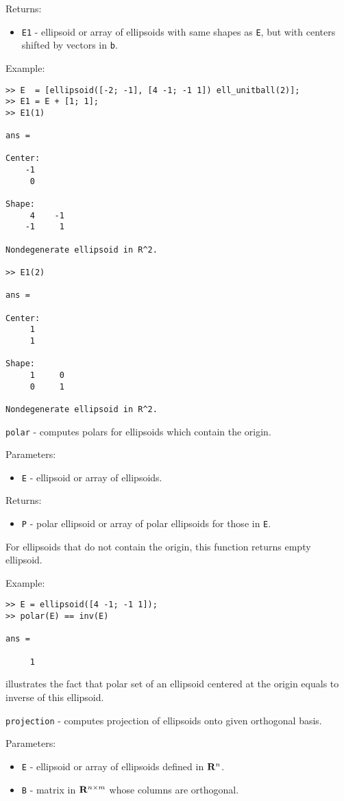 Returns:
\begin{itemize}
\item {\tt E1} - ellipsoid or array of ellipsoids with same shapes as {\tt E},
but with centers shifted by vectors in {\tt b}.
\end{itemize}

Example:
{\tt \begin{verbatim}
>> E  = [ellipsoid([-2; -1], [4 -1; -1 1]) ell_unitball(2)];
>> E1 = E + [1; 1];
>> E1(1)

ans =

Center:
    -1
     0

Shape:
     4    -1
    -1     1

Nondegenerate ellipsoid in R^2.

>> E1(2)

ans =

Center:
     1
     1

Shape:
     1     0
     0     1

Nondegenerate ellipsoid in R^2.
\end{verbatim} }

\newpage

{\Large {\tt polar}} - computes polars for ellipsoids which contain the origin.

Parameters:
\begin{itemize}
\item {\tt E} - ellipsoid or array of ellipsoids.
\end{itemize}

Returns:
\begin{itemize}
\item {\tt P} - polar ellipsoid or array of polar ellipsoids for those
in {\tt E}.
\end{itemize}

For ellipsoids that do not contain the origin, this function returns empty
ellipsoid.

Example:
{\tt \begin{verbatim}
>> E = ellipsoid([4 -1; -1 1]);
>> polar(E) == inv(E)

ans =

     1
\end{verbatim} }
illustrates the fact that polar set of an ellipsoid centered at the origin
equals to inverse of this ellipsoid.

\newpage

{\Large {\tt projection}} - computes projection of ellipsoids onto given
orthogonal basis.

Parameters:
\begin{itemize}
\item {\tt E} - ellipsoid or array of ellipsoids defined in ${\bf R}^n$.
\item {\tt B} - matrix in ${\bf R}^{n\times m}$ whose columns are orthogonal.
\end{itemize}


